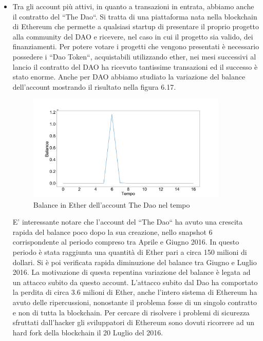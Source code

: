 \documentclass[12pt]{report}
\begin{document}
\begin{itemize}
    \item Tra gli account più attivi, in quanto a transazioni in entrata, abbiamo anche il contratto del ``The Dao``. Si tratta di una piattaforma nata nella blockchain di Ethereum che permette a qualsiasi startup di presentare il proprio progetto alla community del DAO e ricevere, nel caso in cui il progetto sia valido, dei finanziamenti. Per potere votare i progetti che vengono presentati è necessario possedere i ``Dao Token``, acquistabili utilizzando ether, nei mesi successivi al lancio il contratto del DAO ha ricevuto tantissime transazioni ed il successo è stato enorme.
    Anche per DAO abbiamo studiato la variazione del balance dell'account mostrando il risultato nella figura 6.17.
    \begin{figure}[H]
    \centering\includegraphics[width=0.9\textwidth]{TheDao.png}
    \caption{Balance in Ether dell'account The Dao nel tempo}
    \end{figure}
    
    E' interessante notare che l'account del ``The Dao`` ha avuto una crescita rapida del balance poco dopo la sua creazione, nello snapshot 6 corrispondente al periodo compreso tra Aprile e Giugno 2016. In questo periodo è stata raggiunta una quantità di Ether pari a circa 150 milioni di dollari. Si è poi verificata rapida diminuzione del balance tra Giugno e Luglio 2016.
    La motivazione di questa repentina variazione del balance è legata ad un attacco subito da questo account.
    L'attacco subito dal Dao ha comportato la perdita di circa 3.6 milioni di Ether, anche l'intero sistema di Ethereum ha avuto delle ripercussioni, nonostante il problema fosse di un singolo contratto e non di tutta la blockchain.
    Per cercare di risolvere i problemi di sicurezza sfruttati dall'hacker gli sviluppatori di Ethereum sono dovuti ricorrere ad un hard fork della blockchain il 20 Luglio del 2016.
    
\end{itemize}
\end{document}

